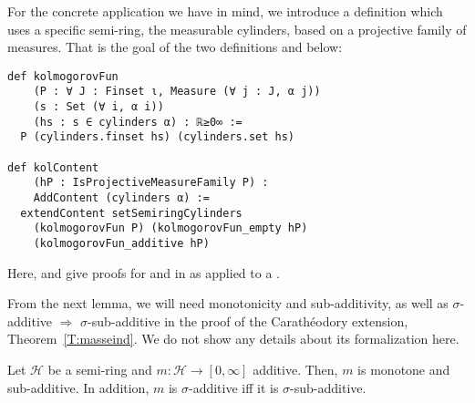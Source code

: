 \documentclass[lean]{DraftAFM}
\begin{document}
For the concrete application we have in mind, we introduce a
definition which uses a specific semi-ring, the measurable cylinders,
based on a projective family of measures.  That is the goal of the two
definitions  and
 below:

\begin{verbatim}
def kolmogorovFun
    (P : ∀ J : Finset ι, Measure (∀ j : J, α j))
    (s : Set (∀ i, α i))
    (hs : s ∈ cylinders α) : ℝ≥0∞ :=
  P (cylinders.finset hs) (cylinders.set hs)

def kolContent
    (hP : IsProjectiveMeasureFamily P) :
    AddContent (cylinders α) :=
  extendContent setSemiringCylinders
    (kolmogorovFun P) (kolmogorovFun_empty hP)
    (kolmogorovFun_additive hP)
\end{verbatim}

Here,  and
  give proofs for
 and  in
 as applied to a
.

\noindent
From the next lemma, we will need monotonicity and sub-additivity, as
well as $\sigma$-additive $\Rightarrow$ $\sigma$-sub-additive in the
proof of the Carathéodory extension,
Theorem~\ref{T:masseind}. We do not show any details
  about its formalization here.

\begin{lemma}\label{l:halbextRing}
  Let $\mathcal H$ be a semi-ring and $m: \mathcal H\to [0,\infty]$
  additive. Then, $m$ is monotone and sub-additive. In addition, $m$
  is $\sigma$-additive iff it is $\sigma$-sub-additive.
\end{lemma}
\end{document}
